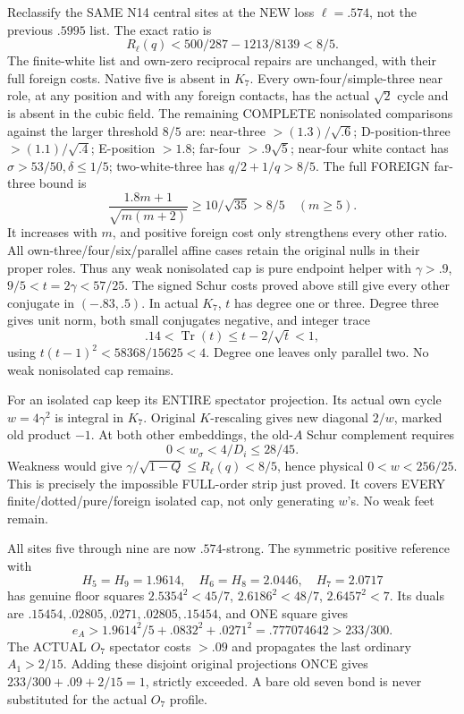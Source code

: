 \documentclass[11pt]{article}
\begin{document}
Reclassify the SAME N14 central sites at the
NEW loss \(\ell=.574\), not the previous
\(.5995\) list.
The exact ratio is
\[
 R_\ell(q)<500/287-1213/8139<8/5 .
\]
The finite-white list and own-zero reciprocal
repairs are unchanged, with their full foreign
costs.
Native five is absent in \(K_7\).
Every own-four/simple-three near role, at
any position and with any foreign contacts,
has the actual \(\sqrt2\) cycle and is absent
in the cubic field.
The remaining COMPLETE nonisolated comparisons
against the larger threshold \(8/5\) are:
near-three \(>(1.3)/\sqrt{.6}\);
D-position-three \(>(1.1)/\sqrt{.4}\);
E-position \(>1.8\);
far-four \(>.9\sqrt5\);
near-four white contact has
\(\sigma>53/50,\delta\le1/5\);
two-white-three has \(q/2+1/q>8/5\).
The full FOREIGN far-three bound is
\[
                {\frac{1.8m+1}{\sqrt{m(m+2)}}}\ge10/\sqrt{35}>8/5
                    \quad(m\ge5).
\]
It increases with \(m\), and positive foreign
cost only strengthens every other ratio.
All own-three/four/six/parallel affine cases
retain the original nulls in their proper roles.
Thus any weak nonisolated cap is pure endpoint
helper with \(\gamma>.9\),
\(9/5<t=2\gamma<57/25\).
The signed Schur costs proved above still give
every other conjugate in \((-.83,.5)\).
In actual \(K_7\), \(t\) has degree one or three.
Degree three gives unit norm, both small
conjugates negative, and integer trace
\[
                      .14<\operatorname{Tr}(t)
                              \le t-2/\sqrt t<1,
\]
using \(t(t-1)^2<58368/15625<4\).
Degree one leaves only parallel two.
No weak nonisolated cap remains.

For an isolated cap keep its ENTIRE spectator
projection.
Its actual own cycle \(w=4\gamma^2\) is integral
in \(K_7\).
Original \(K\)-rescaling gives new diagonal
\(2/w\), marked old product \(-1\).
At both other embeddings, the old-\(A\)
Schur complement requires
\[
                       0<w_\sigma<4/D_i\le28/45 .
\]
Weakness would give
\(\gamma/\sqrt{1-Q}\le R_\ell(q)<8/5\),
hence physical \(0<w<256/25\).
This is precisely the impossible FULL-order
strip just proved.
It covers EVERY finite/dotted/pure/foreign
isolated cap, not only generating \(w\)'s.
No weak feet remain.

All sites five through nine are now
\(.574\)-strong.
The symmetric positive reference with
\[
 H_5=H_9=1.9614,\quad H_6=H_8=2.0446,\quad H_7=2.0717
\]
has genuine floor squares
\(2.5354^2<45/7\), \(2.6186^2<48/7\),
\(2.6457^2<7\).
Its duals are
\(.15454,.02805,.0271,.02805,.15454\),
and ONE square gives
\[
 e_A>1.9614^2/5+.0832^2+.0271^2
                         =.777074642>233/300 .
\]
The ACTUAL \(O_7\) spectator costs \(>.09\)
and propagates the last ordinary \(A_1>2/15\).
Adding these disjoint original projections
ONCE gives \(233/300+.09+2/15=1\), strictly
exceeded.
A bare old seven bond is never substituted
for the actual \(O_7\) profile.
\end{document}
